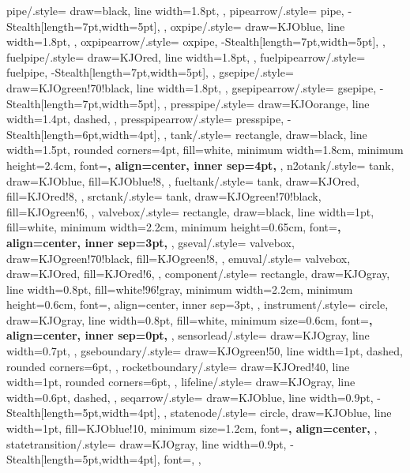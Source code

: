 {  %
  pipe/.style={
    draw=black, line width=1.8pt,
  },
  pipearrow/.style={
    pipe,
    -{Stealth[length=7pt,width=5pt]},
  },
  oxpipe/.style={
    draw=KJOblue, line width=1.8pt,
  },
  oxpipearrow/.style={
    oxpipe,
    -{Stealth[length=7pt,width=5pt]},
  },
  fuelpipe/.style={
    draw=KJOred, line width=1.8pt,
  },
  fuelpipearrow/.style={
    fuelpipe,
    -{Stealth[length=7pt,width=5pt]},
  },
  gsepipe/.style={
    draw=KJOgreen!70!black, line width=1.8pt,
  },
  gsepipearrow/.style={
    gsepipe,
    -{Stealth[length=7pt,width=5pt]},
  },
  presspipe/.style={
    draw=KJOorange, line width=1.4pt, dashed,
  },
  presspipearrow/.style={
    presspipe,
    -{Stealth[length=6pt,width=4pt]},
  },
  tank/.style={
    rectangle, draw=black, line width=1.5pt,
    rounded corners=4pt, fill=white,
    minimum width=1.8cm, minimum height=2.4cm,
    font=\small\bfseries, align=center, inner sep=4pt,
  },
  n2otank/.style={
    tank, draw=KJOblue, fill=KJOblue!8,
  },
  fueltank/.style={
    tank, draw=KJOred, fill=KJOred!8,
  },
  srctank/.style={
    tank, draw=KJOgreen!70!black, fill=KJOgreen!6,
  },
  valvebox/.style={
    rectangle, draw=black, line width=1pt,
    fill=white, minimum width=2.2cm, minimum height=0.65cm,
    font=\footnotesize\bfseries, align=center, inner sep=3pt,
  },
  gseval/.style={
    valvebox, draw=KJOgreen!70!black, fill=KJOgreen!8,
  },
  emuval/.style={
    valvebox, draw=KJOred, fill=KJOred!6,
  },
  component/.style={
    rectangle, draw=KJOgray, line width=0.8pt,
    fill=white!96!gray, minimum width=2.2cm, minimum height=0.6cm,
    font=\footnotesize, align=center, inner sep=3pt,
  },
  instrument/.style={
    circle, draw=KJOgray, line width=0.8pt,
    fill=white, minimum size=0.6cm,
    font=\tiny\bfseries, align=center, inner sep=0pt,
  },
  sensorlead/.style={
    draw=KJOgray, line width=0.7pt,
  },
  gseboundary/.style={
    draw=KJOgreen!50, line width=1pt, dashed,
    rounded corners=6pt,
  },
  rocketboundary/.style={
    draw=KJOred!40, line width=1pt,
    rounded corners=6pt,
  },
  lifeline/.style={
    draw=KJOgray, line width=0.6pt, dashed,
  },
  seqarrow/.style={
    draw=KJOblue, line width=0.9pt,
    -{Stealth[length=5pt,width=4pt]},
  },
  statenode/.style={
    circle, draw=KJOblue, line width=1pt,
    fill=KJOblue!10,
    minimum size=1.2cm,
    font=\small\bfseries, align=center,
  },
  statetransition/.style={
    draw=KJOgray, line width=0.9pt,
    -{Stealth[length=5pt,width=4pt]},
    font=\footnotesize,
  },
}
